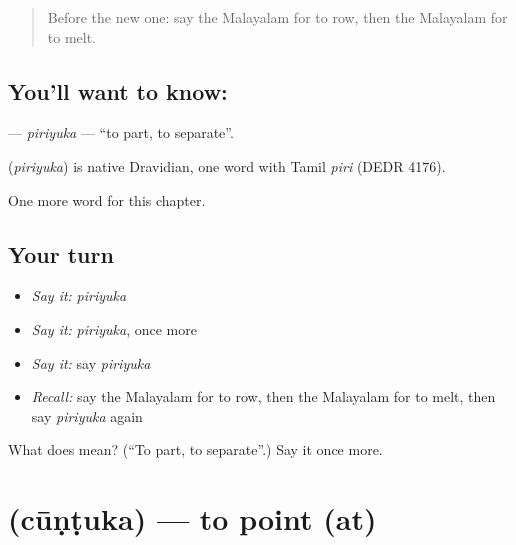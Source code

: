\label{lesson:ML-C191-piriyuka}



\begin{quote}
Before the new one: say the Malayalam for to row, then the Malayalam for to melt.
\end{quote}

\subsection*{You'll want to know: }
\textbf{} — \emph{piriyuka} — \textquotedblleft{}to part, to separate\textquotedblright{}.

\begin{cousinweb}
\textbf{} (\emph{piriyuka}) is native Dravidian, one word with Tamil \emph{piri} (DEDR 4176).
\end{cousinweb}

\begin{grammarlens}[title={What you've built}]
One more word for this chapter.
\end{grammarlens}

\subsection*{Your turn}
\begin{itemize}
\raggedright
  \item \emph{Say it:} \emph{piriyuka}
  \item \emph{Say it:} \emph{piriyuka}, once more
  \item \emph{Say it:} say \emph{piriyuka}
  \item \emph{Recall:} say the Malayalam for to row, then the Malayalam for to melt, then say \emph{piriyuka} again
\end{itemize}

\begin{tcolorbox}[breakable,colback=teal!4,colframe=teal!35!black,title={Before you move on}]
What does  mean? (\textquotedblleft{}To part, to separate\textquotedblright{}.) Say it once more.
\end{tcolorbox}
\section[\texorpdfstring{\ml{ചൂണ്ടുക} (cūṇṭuka)}{ചൂണ്ടുക (cūṇṭuka)}]{ (cūṇṭuka) — to point (at)}

\label{lesson:ML-C191-cuntuka}



